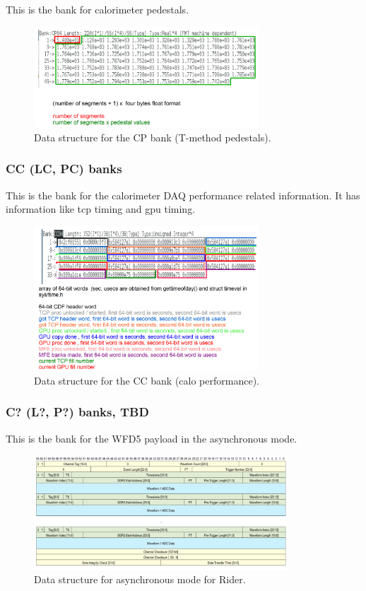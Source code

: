 This is the bank for calorimeter pedestals.

\begin{figure}[htbp]
\centering
\includegraphics[width=0.75\textwidth]{pics/CPBankFormat.pdf} 
\caption{Data structure for the CP bank (T-method pedestals).}\label{fig:CPBankFormat}
\end{figure}

\subsubsection*{CC (LC, PC) banks}

This is the bank for the calorimeter DAQ performance related information.
It has information like tcp timing and gpu timing.

\begin{figure}[htbp]
\centering
\includegraphics[width=0.75\textwidth]{pics/CCBankFormat.pdf} 
\caption{Data structure for the CC bank (calo performance).}\label{fig:CCBankFormat}
\end{figure}

\subsubsection*{C? (L?, P?) banks, TBD}

This is the bank for the WFD5 payload in the asynchronous mode.

\begin{figure}[htbp]
\centering
\includegraphics[width=0.85\textwidth]{pics/AsyncRiderData.pdf} 
\caption{Data structure for asynchronous mode for Rider.}\label{fig:AsyncRiderData}
\end{figure}

